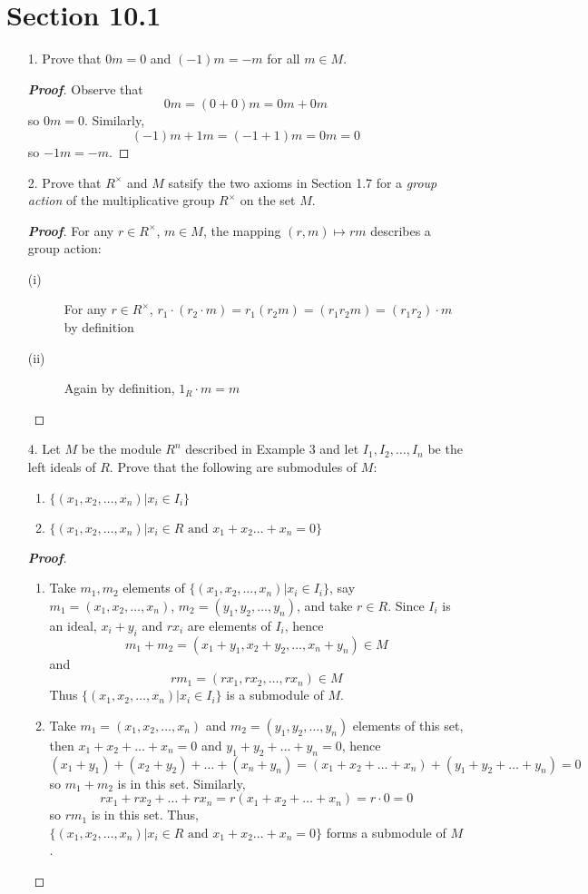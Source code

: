\documentclass[12pt,leqno]{book}
\theoremstyle{definition}
\newenvironment{Proof}{\begin{proof}[\textnormal{\textbf{Proof}}]}{\end{proof}}
\begin{document}
\section*{Section 10.1}
\begin{enumerate}
 \item [1.] Prove that $0m=0$ and $(-1)m=-m$ for all $m\in M$.

\begin{Proof}
 Observe that \[0m=(0+0)m=0m+0m\] so $0m=0$. Similarly, \[(-1)m+1m=(-1+1)m=0m=0\] so $-1m=-m$.
\end{Proof}

 \item [2.] Prove that $R^{\times}$ and $M$ satsify the two axioms in Section 1.7 for a \textit{group action} of the multiplicative group $R^{\times}$ on the set $M$.

\begin{Proof}
 For any $r\in R^{\times}$, $m\in M$, the mapping $(r,m)\mapsto rm$ describes a group action:\indent
\begin{description}
 \item [(i)] For any $r\in R^{\times}$, $r_1\cdot(r_2\cdot m)=r_1(r_2m)=(r_1r_2m)=(r_1r_2)\cdot m$ by definition
 \item [(ii)] Again by definition, $1_R\cdot m=m$
\end{description}

\end{Proof}

 \item [4.] Let $M$ be the module $R^n$ described in Example 3 and let $I_1,I_2,\hdots,I_n$ be the left ideals of $R$. Prove that the following are submodules of $M$:
  \begin{enumerate}
   \item $\{(x_1,x_2,\hdots,x_n)|x_i\in I_i\}$
   \item $\{(x_1,x_2,\hdots,x_n)|x_i\in R\text{ and }x_1+x_2\hdots+x_n=0\}$
  \end{enumerate}

\begin{Proof}
 \begin{enumerate}
  \item Take $m_1,m_2$ elements of $\{(x_1,x_2,\hdots,x_n)|x_i\in I_i\}$, say $m_1=(x_1,x_2,\hdots,x_n)$, $m_2=(y_1,y_2,\hdots,y_n)$, and take $r\in R$. Since $I_i$ is an ideal, $x_i+y_i$ and $rx_i$ are elements of $I_i$, hence \[m_1+m_2=(x_1+y_1,x_2+y_2,\hdots,x_n+y_n)\in M\] and  \[rm_1=(rx_1,rx_2,\hdots,rx_n)\in M\] Thus $\{(x_1,x_2,\hdots,x_n)|x_i\in I_i\}$  is a submodule of $M$.
  \item Take $m_1=(x_1,x_2,\hdots,x_n)$ and $m_2=(y_1,y_2,\hdots,y_n)$ elements of this set, then $x_1+x_2+\hdots+x_n=0$ and $y_1+y_2+\hdots+y_n=0$, hence \[(x_1+y_1)+(x_2+y_2)+\hdots+(x_n+y_n)=(x_1+x_2+\hdots+x_n)+(y_1+y_2+\hdots+y_n)=0\] so $m_1+m_2$ is in this set. Similarly, \[rx_1+rx_2+\hdots+rx_n=r(x_1+x_2+\hdots+x_n)=r\cdot0=0\] so $rm_1$ is in this set. Thus, $\{(x_1,x_2,\hdots,x_n)|x_i\in R\text{ and }x_1+x_2\hdots+x_n=0\}$ forms a submodule of $M$.
 \end{enumerate}


\end{Proof}
\end{enumerate}
\end{document}
